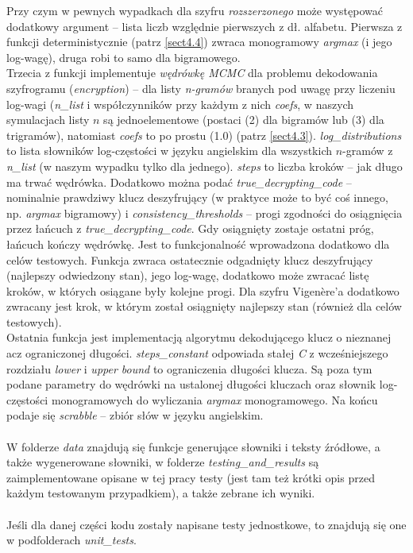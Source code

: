 \documentclass[a4paper]{article}
\theoremstyle{defn}
\theoremstyle{theorem}
\theoremstyle{lemma}
\theoremstyle{cor}
\theoremstyle{fact}
\begin{document}
Przy czym w pewnych wypadkach dla szyfru \textit{rozszerzonego} może występować dodatkowy argument – lista liczb względnie pierwszych z dł. alfabetu.
Pierwsza z funkcji deterministycznie (patrz \ref{sect4.4}) zwraca monogramowy \textit{argmax} (i jego log-wagę), druga robi to samo dla bigramowego. \\
Trzecia z funkcji implementuje \textit{wędrówkę MCMC} dla problemu dekodowania szyfrogramu (\textit{encryption}) – dla listy \textit{n-gramów} branych pod uwagę przy liczeniu log-wagi (\textit{n\_list} i współczynników przy każdym z nich \textit{coefs}, w naszych symulacjach listy $n$ są jednoelementowe (postaci (2) dla bigramów lub (3) dla trigramów), natomiast \textit{coefs} to po prostu (1.0) (patrz \ref{sect4.3}). \textit{log\_distributions} to lista słowników log-częstości w języku angielskim dla wszystkich $n$-gramów z \textit{n\_list} (w naszym wypadku tylko dla jednego). \textit{steps} to liczba kroków – jak długo ma trwać wędrówka. Dodatkowo można podać \textit{true\_decrypting\_code} – nominalnie prawdziwy klucz deszyfrujący (w praktyce może to być coś innego, np. \textit{argmax} bigramowy) i \textit{consistency\_thresholds} – progi zgodności do osiągnięcia przez łańcuch z \textit{true\_decrypting\_code}. Gdy osiągnięty zostaje ostatni próg, łańcuch kończy wędrówkę. Jest to funkcjonalność wprowadzona dodatkowo dla celów testowych. Funkcja zwraca ostatecznie odgadnięty klucz deszyfrujący (najlepszy odwiedzony stan), jego log-wagę, dodatkowo może zwracać listę kroków, w których osiągane były kolejne progi. Dla szyfru Vigenère'a dodatkowo zwracany jest krok, w którym został osiągnięty najlepszy stan (również dla celów testowych).\\
Ostatnia funkcja jest implementacją algorytmu dekodującego klucz o nieznanej acz ograniczonej długości. \textit{steps\_constant} odpowiada stałej \textit{C} z wcześniejszego rozdziału \textit{lower} i \textit{upper bound} to ograniczenia długości klucza. Są poza tym podane parametry do wędrówki na ustalonej długości kluczach oraz słownik log-częstości monogramowych do wyliczania \textit{argmax} monogramowego. Na końcu podaje się \textit{scrabble} – zbiór słów w języku angielskim.\\\\
W folderze \textit{data} znajdują się funkcje generujące słowniki i teksty źródłowe, a także wygenerowane słowniki, w folderze \textit{testing\_and\_results} są zaimplementowane opisane w tej pracy testy (jest tam też krótki opis przed każdym testowanym przypadkiem), a także zebrane ich wyniki.\\\\
Jeśli dla danej części kodu zostały napisane testy jednostkowe, to znajdują się one w podfolderach \textit{unit\_tests}.
\end{document}
